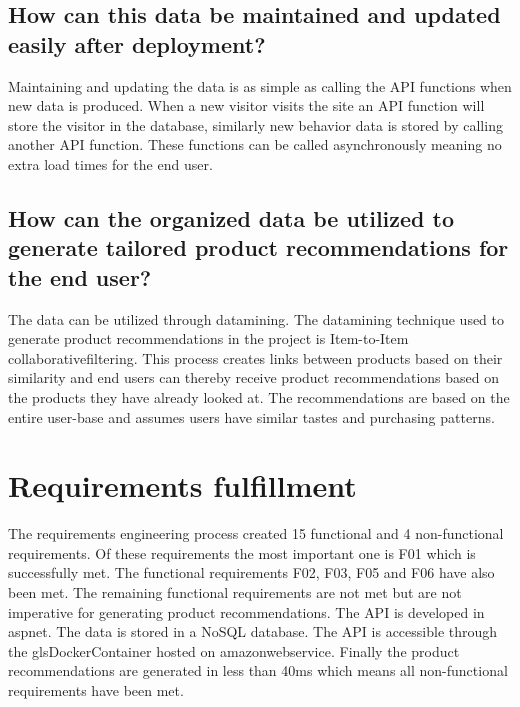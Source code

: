 \subsection{How can this data be maintained and updated easily after deployment?}
Maintaining and updating the data is as simple as calling the \gls{API} functions when new data is produced. When a new visitor visits the site an \gls{API} function will store the visitor in the database, similarly new behavior data is stored by calling another \gls{API} function. These functions can be called asynchronously meaning no extra load times for the end user.

\subsection{How can the organized data be utilized to generate tailored product recommendations for the end user?}
The data can be utilized through \gls{datamining}. The \gls{datamining} technique used to generate product recommendations in the project is Item-to-Item \gls{collaborativefiltering}. This process creates links between products based on their similarity and end users can thereby receive product recommendations based on the products they have already looked at. The recommendations are based on the entire user-base and assumes users have similar tastes and purchasing patterns.

\section{Requirements fulfillment}
The requirements engineering process created 15 functional and 4 non-functional requirements. Of these requirements the most important one is F01 which is successfully met. The functional requirements F02, F03, F05 and F06 have also been met. The remaining functional requirements are not met but are not imperative for generating product recommendations. The \gls{API} is developed in \gls{aspnet}. The data is stored in a \gls{NoSQL} database. The \gls{API} is accessible through the gls{DockerContainer} hosted on \gls{amazonwebservice}. Finally the product recommendations are generated in less than 40ms which means all non-functional requirements have been met.
